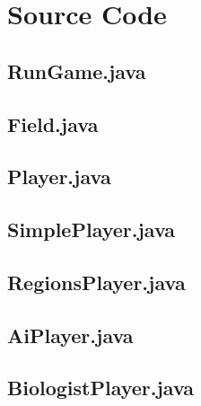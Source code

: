 \documentclass[pdftex,12pt,a4paper]{article}
\begin{document}
	\section{Source Code}
		\subsection{RunGame.java}
			
		\subsection{Field.java}
			
		\subsection{Player.java}
			
		\subsection{SimplePlayer.java}
			
		\subsection{RegionsPlayer.java}
			
		\subsection{AiPlayer.java}
			
		\subsection{BiologistPlayer.java}
			
\end{document}

